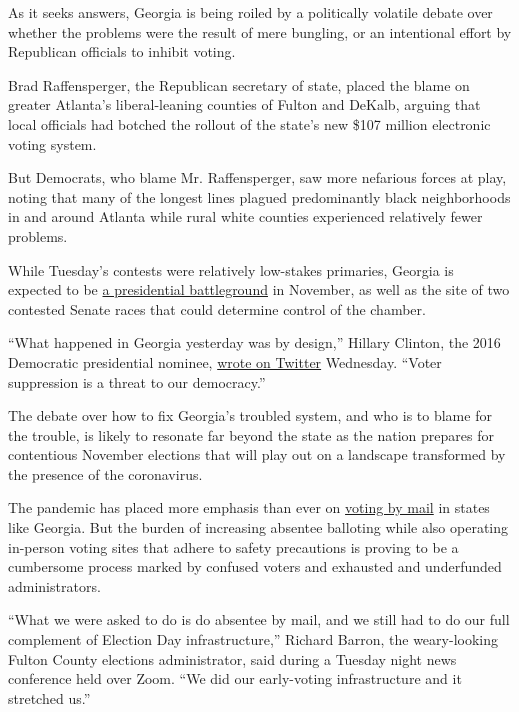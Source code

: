 As it seeks answers, Georgia is being roiled by a politically volatile
debate over whether the problems were the result of mere bungling, or an
intentional effort by Republican officials to inhibit voting.

Brad Raffensperger, the Republican secretary of state, placed the blame
on greater Atlanta's liberal-leaning counties of Fulton and DeKalb,
arguing that local officials had botched the rollout of the state's new
\$107 million electronic voting system.

But Democrats, who blame Mr. Raffensperger, saw more nefarious forces at
play, noting that many of the longest lines plagued predominantly black
neighborhoods in and around Atlanta while rural white counties
experienced relatively fewer problems.

While Tuesday's contests were relatively low-stakes primaries, Georgia
is expected to be
\href{https://www.nytimes3xbfgragh.onion/2020/06/09/us/politics/georgia-primary-election-senate-race-jon-ossoff.html}{a
presidential battleground} in November, as well as the site of two
contested Senate races that could determine control of the chamber.

``What happened in Georgia yesterday was by design,'' Hillary Clinton,
the 2016 Democratic presidential nominee,
\href{https://twitter.com/HillaryClinton/status/1270726057692327937?s=20}{wrote
on Twitter} Wednesday. ``Voter suppression is a threat to our
democracy.''

The debate over how to fix Georgia's troubled system, and who is to
blame for the trouble, is likely to resonate far beyond the state as the
nation prepares for contentious November elections that will play out on
a landscape transformed by the presence of the coronavirus.

The pandemic has placed more emphasis than ever on
\href{https://www.nytimes3xbfgragh.onion/2020/06/10/us/politics/voting-by-mail-georgia.html}{voting
by mail} in states like Georgia. But the burden of increasing absentee
balloting while also operating in-person voting sites that adhere to
safety precautions is proving to be a cumbersome process marked by
confused voters and exhausted and underfunded administrators.

``What we were asked to do is do absentee by mail, and we still had to
do our full complement of Election Day infrastructure,'' Richard Barron,
the weary-looking Fulton County elections administrator, said during a
Tuesday night news conference held over Zoom. ``We did our early-voting
infrastructure and it stretched us.''

